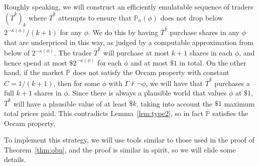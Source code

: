 \documentclass[authordate,onecolumn,noenvironments]{miri-tech-article}
\numberwithin{equation}{subsection}
\newcommand{\seq}[1]{{\overline{#1}}}
\newcommand{\trade}{T}%
\newcommand{\Trader}{\seq{\trade}} %
\newcommand{\BelState}{\mathbb{P}}
\newcommand{\pt}{\BelState}
\newcommand{\MP}{\seq{\pt}}
\newcommand{\Theory}{\Gamma}
\begin{document}
Roughly speaking, we will construct an efficiently emulatable sequence of traders $(\Trader^k)_k$ where $\Trader^k$ attempts to ensure that $\pt_n(\phi)$
does not drop below 
$2^{-\kappa(\phi)}/(k+1)$ for any $\phi$. We do this by having $\Trader^k$ purchase shares in any $\phi$ that are underpriced in this way, as
judged by a computable  approximation from below of $2^{-\kappa(\phi)}$. The trader $\Trader^k$ will purchase at most $k+1$ shares in each $\phi$, and hence 
spend at most $\$ 2^{-\kappa(\phi)}$ for each $\phi$ and at most $\$1$ in total.
On the other hand, if the market $\MP$ does not satisfy the Occam property with constant $C = 1/(k+1)$, then for some $\phi$ with
$\Theory \not\vdash \lnot \phi$, we will have that
$\Trader^k$ purchases a full $k+1$ shares in $\phi$. Since there is always a plausible world that values $\phi$ at $\$1$, $\Trader^k$ will have a plausible value
of at least $\$ k$,  taking into account the $\$ 1$ maximum total prices paid. This contradicts Lemma~\ref{lem:type2}, so in fact $\MP$ satisfies the Occam property. 

To implement this strategy, we will use tools similar to those used in the proof of Theorem~\ref{thm:obu}, and the proof is similar 
in spirit, so we will elide some details. 
\end{document}
